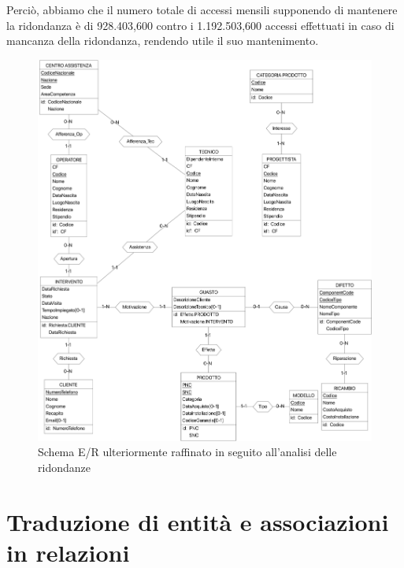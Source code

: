 \documentclass[a4paper, 12pt]{report}
\begin{document}
\newpage

Perciò, abbiamo che il numero totale di accessi mensili supponendo di mantenere la ridondanza è di 928.403,600 contro i 1.192.503,600 accessi effettuati in caso di mancanza della
ridondanza, rendendo utile il suo mantenimento.

\begin{figure}[H]
	\centering
	\includegraphics[width=\linewidth]{images/Unredundant.png}
	\caption{Schema E/R ulteriormente raffinato in seguito all'analisi delle ridondanze}
\end{figure}

\section{Traduzione di entità e associazioni in relazioni}
\end{document}
